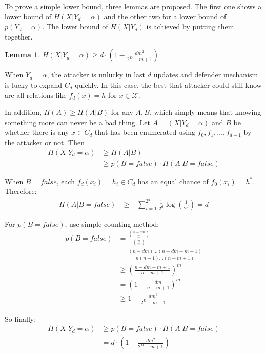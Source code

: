 \documentclass[10pt, conference, compsocconf]{IEEEtran}
\newtheorem{mylemma}{Lemma}
\begin{document}
        To prove a simple lower bound, three lemmas are proposed.
        The first one shows a lower bound of $H(X | Y_d = \alpha)$
        and the other two for a lower bound of $p(Y_d = \alpha)$.
        The lower bound of $H(X | Y_d)$ is achieved by putting
        them together.

        \begin{mylemma}\label{lem1}
            $H(X|Y_d = \alpha) \geq d \cdot (1-\frac{dm^2}{2^D-m+1})$
        \end{mylemma}

        \begin{IEEEproof}
            When $Y_d = \alpha$, the attacker
            is unlucky in last $d$ updates
            and defender mechanism is lucky
            to expand $C_d$ quickly.
            In this case, the best that attacker
            could still know are all relations
            like $f_d(x) = h$ for $x \in \mathcal X$.

            In addition, $H(A) \geq H(A|B)$ for
            any $A, B$, which simply means that knowing something
            more can never be a bad thing. Let $A = (X | Y_d = \alpha)$
            and $B$ be whether there is any $x \in C_d$ that
            has been enumerated using $f_0, f_1, \ldots, f_{d-1}$
            by the attacker or not.
            Then
            \begin{align*}
                H(X | Y_d = \alpha) %
                    &\geq H(A | B)\\
                    &\geq p(B = false) \cdot H(A | B = false)
            \end{align*}

            When $B = false$, each $f_d(x_i) = h_i \in C_d$
            has an equal chance of $f_0(x_i) = h^*$. Therefore:
            \begin{align*}
                H(A | B = false) &\geq -\sum_{i = 1}^{2^d} \frac{1}{2^d} \log(\frac{1}{2^d})
                    = d
            \end{align*}

            For $p(B = false)$, use simple counting method:
            \begin{align*}
                p(B = false) &= \frac{\binom{n-dm}{m}}{\binom{n}{m}}\\
                    &= \frac{(n-dm)\ldots(n-dm-m+1)}{n(n-1)\ldots(n-m+1)}\\
                    &\geq (\frac{n-dm-m+1}{n-m+1})^m\\
                    &= (1-\frac{dm}{n-m+1})^m\\
                    &\geq 1-\frac{dm^2}{2^D-m+1}
            \end{align*}

            So finally:
            \begin{align*}
                H(X | Y_d = \alpha) &\geq p(B = false) \cdot H(A | B = false)\\
                    &= d \cdot (1-\frac{dm^2}{2^D-m+1})
            \end{align*}
        \end{IEEEproof}
\end{document}
